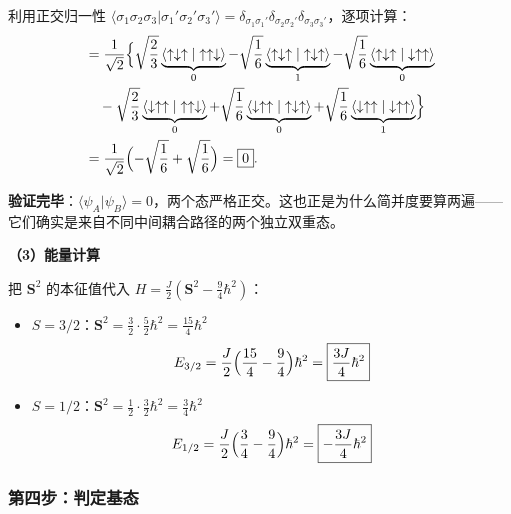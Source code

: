 利用正交归一性 $\langle \sigma_1\sigma_2\sigma_3 | \sigma_1'\sigma_2'\sigma_3'\rangle = \delta_{\sigma_1\sigma_1'}\delta_{\sigma_2\sigma_2'}\delta_{\sigma_3\sigma_3'}$，逐项计算：
\begin{align*}
&= \frac{1}{\sqrt{2}} \Bigl\{ \sqrt{\frac{2}{3}}\underbrace{\langle \uparrow\downarrow\uparrow | \uparrow\uparrow\downarrow \rangle}_{0} - \sqrt{\frac{1}{6}}\underbrace{\langle \uparrow\downarrow\uparrow | \uparrow\downarrow\uparrow \rangle}_{1} - \sqrt{\frac{1}{6}}\underbrace{\langle \uparrow\downarrow\uparrow | \downarrow\uparrow\uparrow \rangle}_{0} \\
&\quad - \sqrt{\frac{2}{3}}\underbrace{\langle \downarrow\uparrow\uparrow | \uparrow\uparrow\downarrow \rangle}_{0} + \sqrt{\frac{1}{6}}\underbrace{\langle \downarrow\uparrow\uparrow | \uparrow\downarrow\uparrow \rangle}_{0} + \sqrt{\frac{1}{6}}\underbrace{\langle \downarrow\uparrow\uparrow | \downarrow\uparrow\uparrow \rangle}_{1} \Bigr\} \\
&= \frac{1}{\sqrt{2}} \Bigl( -\sqrt{\frac{1}{6}} + \sqrt{\frac{1}{6}} \Bigr) = \boxed{0}.
\end{align*}

\textbf{验证完毕}：$\langle \psi_A | \psi_B \rangle = 0$，两个态严格正交。这也正是为什么简并度要算两遍——它们确实是来自不同中间耦合路径的两个独立双重态。

\textbf{（3）能量计算}

把 $\bm{S}^2$ 的本征值代入 $H = \frac{J}{2}(\bm{S}^2 - \frac{9}{4}\hbar^2)$：
\begin{itemize}[nosep]
    \item $S = 3/2$：$\bm{S}^2 = \frac{3}{2} \cdot \frac{5}{2} \hbar^2 = \frac{15}{4}\hbar^2$
    \[
    E_{3/2} = \frac{J}{2}\Bigl(\frac{15}{4} - \frac{9}{4}\Bigr)\hbar^2 = \boxed{\frac{3J}{4}\hbar^2}
    \]
    \item $S = 1/2$：$\bm{S}^2 = \frac{1}{2} \cdot \frac{3}{2} \hbar^2 = \frac{3}{4}\hbar^2$
    \[
    E_{1/2} = \frac{J}{2}\Bigl(\frac{3}{4} - \frac{9}{4}\Bigr)\hbar^2 = \boxed{-\frac{3J}{4}\hbar^2}
    \]
\end{itemize}

\subsubsection{第四步：判定基态}

